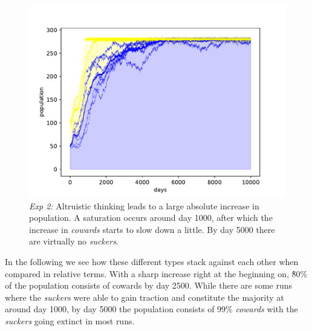 \documentclass[sigconf]{acmart}
\newcommand{\cowards}{\textit{cowards}\xspace}
\newcommand{\suckers}{\textit{suckers}\xspace}
\begin{document}
    \begin{figure}
        \includegraphics[width=\columnwidth]{figures/alt_cow_increase_separated}
        \caption{\textit{Exp 2:} Altruistic thinking leads to a large absolute increase in population.
        A saturation occurs around day 1000, after which the increase in \cowards starts to slow down a little.
        By day 5000 there are virtually no \suckers.}
        \label{fig:alt_cow_separated}
    \end{figure}

    In the following  we see how these different types stack against each other when compared in relative terms.
    With a sharp increase right at the beginning on, \~ 80\% of the population consists of cowards by day 2500.
    While there are some runs where the \suckers were able to gain traction and constitute the majority at around day 1000, by day 5000 the population consists of 99\% \cowards with the \suckers going extinct in most runs.
\end{document}
